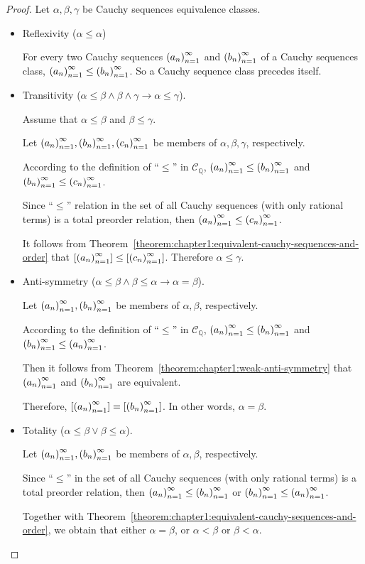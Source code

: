 \begin{proof}
    Let $\alpha, \beta, \gamma$ be Cauchy sequences equivalence classes.
    \begin{itemize}
        \item Reflexivity ($\alpha\le\alpha$)

              For every two Cauchy sequences ${\left({a_{n}}\right)}^{\infty}_{n=1}$ and ${\left({b_{n}}\right)}^{\infty}_{n=1}$ of a Cauchy sequences class, ${\left({a_{n}}\right)}^{\infty}_{n=1}\le{\left({b_{n}}\right)}^{\infty}_{n=1}$. So a Cauchy sequence class precedes itself.
        \item Transitivity ($\alpha\le\beta\land\beta\land\gamma\rightarrow\alpha\le\gamma$).

              Assume that $\alpha\le\beta$ and $\beta\le\gamma$.

              Let ${\left({a_{n}}\right)}^{\infty}_{n=1}, {\left({b_{n}}\right)}^{\infty}_{n=1}, {\left({c_{n}}\right)}^{\infty}_{n=1}$ be members of $\alpha, \beta, \gamma$, respectively.

              According to the definition of ``$\le$'' in $\mathscr{C}_{\mathbb{Q}}$, ${\left({a_{n}}\right)}^{\infty}_{n=1}\le{\left({b_{n}}\right)}^{\infty}_{n=1}$ and ${\left({b_{n}}\right)}^{\infty}_{n=1}\le{\left({c_{n}}\right)}^{\infty}_{n=1}$.

              Since ``$\le$'' relation in the set of all Cauchy sequences (with only rational terms) is a total preorder relation, then ${\left({a_{n}}\right)}^{\infty}_{n=1}\le{\left({c_{n}}\right)}^{\infty}_{n=1}$.

              It follows from Theorem~\ref{theorem:chapter1:equivalent-cauchy-sequences-and-order} that $\left[{{\left({a_{n}}\right)}^{\infty}_{n=1}}\right]\le\left[{{\left({c_{n}}\right)}^{\infty}_{n=1}}\right]$. Therefore $\alpha\le\gamma$.

        \item Anti-symmetry ($\alpha\le\beta\land\beta\le\alpha\rightarrow\alpha=\beta$).

              Let ${\left({a_{n}}\right)}^{\infty}_{n=1}, {\left({b_{n}}\right)}^{\infty}_{n=1}$ be members of $\alpha, \beta$, respectively.

              According to the definition of ``$\le$'' in $\mathscr{C}_{\mathbb{Q}}$, ${\left({a_{n}}\right)}^{\infty}_{n=1}\le{\left({b_{n}}\right)}^{\infty}_{n=1}$ and ${\left({b_{n}}\right)}^{\infty}_{n=1}\le{\left({a_{n}}\right)}^{\infty}_{n=1}$.

              Then it follows from Theorem~\ref{theorem:chapter1:weak-anti-symmetry} that ${\left({a_{n}}\right)}^{\infty}_{n=1}$ and ${\left({b_{n}}\right)}^{\infty}_{n=1}$ are equivalent.

              Therefore, $\left[{{\left({a_{n}}\right)}^{\infty}_{n=1}}\right] = \left[{{\left({b_{n}}\right)}^{\infty}_{n=1}}\right]$. In other words, $\alpha = \beta$.
        \item Totality ($\alpha\le\beta\vee\beta\le\alpha$).

              Let ${\left({a_{n}}\right)}^{\infty}_{n=1}, {\left({b_{n}}\right)}^{\infty}_{n=1}$ be members of $\alpha, \beta$, respectively.

              Since ``$\le$'' in the set of all Cauchy sequences (with only rational terms) is a total preorder relation, then ${\left({a_{n}}\right)}^{\infty}_{n=1}\le{\left({b_{n}}\right)}^{\infty}_{n=1}$ or ${\left({b_{n}}\right)}^{\infty}_{n=1}\le{\left({a_{n}}\right)}^{\infty}_{n=1}$.

              Together with Theorem~\ref{theorem:chapter1:equivalent-cauchy-sequences-and-order}, we obtain that either $\alpha = \beta$, or $\alpha < \beta$ or $\beta < \alpha$.\qedhere
    \end{itemize}
\end{proof}

